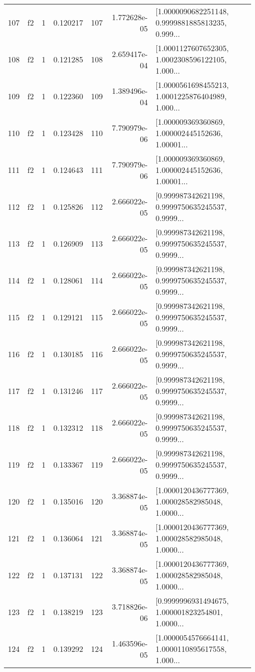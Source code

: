 \begin{tabular}{lllrlrl}
107 &  f2 &   1 &  0.120217 &  107 &  1.772628e-05 &  [1.0000090682251148, 0.9999881885813235, 0.999... \\
108 &  f2 &   1 &  0.121285 &  108 &  2.659417e-04 &  [1.0001127607652305, 1.0002308596122105, 1.000... \\
109 &  f2 &   1 &  0.122360 &  109 &  1.389496e-04 &  [1.0000561698455213, 1.0001225876404989, 1.000... \\
110 &  f2 &   1 &  0.123428 &  110 &  7.790979e-06 &  [1.000009369360869, 1.000002445152636, 1.00001... \\
111 &  f2 &   1 &  0.124643 &  111 &  7.790979e-06 &  [1.000009369360869, 1.000002445152636, 1.00001... \\
112 &  f2 &   1 &  0.125826 &  112 &  2.666022e-05 &  [0.999987342621198, 0.9999750635245537, 0.9999... \\
113 &  f2 &   1 &  0.126909 &  113 &  2.666022e-05 &  [0.999987342621198, 0.9999750635245537, 0.9999... \\
114 &  f2 &   1 &  0.128061 &  114 &  2.666022e-05 &  [0.999987342621198, 0.9999750635245537, 0.9999... \\
115 &  f2 &   1 &  0.129121 &  115 &  2.666022e-05 &  [0.999987342621198, 0.9999750635245537, 0.9999... \\
116 &  f2 &   1 &  0.130185 &  116 &  2.666022e-05 &  [0.999987342621198, 0.9999750635245537, 0.9999... \\
117 &  f2 &   1 &  0.131246 &  117 &  2.666022e-05 &  [0.999987342621198, 0.9999750635245537, 0.9999... \\
118 &  f2 &   1 &  0.132312 &  118 &  2.666022e-05 &  [0.999987342621198, 0.9999750635245537, 0.9999... \\
119 &  f2 &   1 &  0.133367 &  119 &  2.666022e-05 &  [0.999987342621198, 0.9999750635245537, 0.9999... \\
120 &  f2 &   1 &  0.135016 &  120 &  3.368874e-05 &  [1.0000120436777369, 1.000028582985048, 1.0000... \\
121 &  f2 &   1 &  0.136064 &  121 &  3.368874e-05 &  [1.0000120436777369, 1.000028582985048, 1.0000... \\
122 &  f2 &   1 &  0.137131 &  122 &  3.368874e-05 &  [1.0000120436777369, 1.000028582985048, 1.0000... \\
123 &  f2 &   1 &  0.138219 &  123 &  3.718826e-06 &  [0.9999996931494675, 1.000001823254801, 1.0000... \\
124 &  f2 &   1 &  0.139292 &  124 &  1.463596e-05 &  [1.0000054576664141, 1.0000110895617558, 1.000... \\

\end{tabular}
